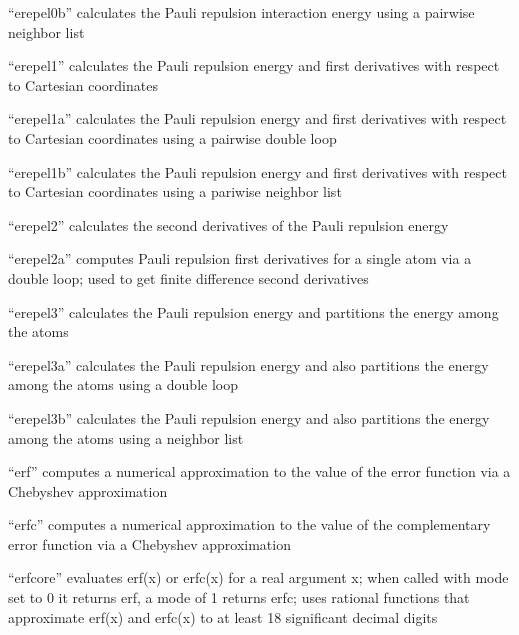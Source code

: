 \documentclass[letterpaper,11pt,english]{sphinxmanual}
\begin{document}
“erepel0b” calculates the Pauli repulsion interaction energy
using a pairwise neighbor list


“erepel1” calculates the Pauli repulsion energy and first
derivatives with respect to Cartesian coordinates


“erepel1a” calculates the Pauli repulsion energy and first
derivatives with respect to Cartesian coordinates using a
pairwise double loop


“erepel1b” calculates the Pauli repulsion energy and first
derivatives with respect to Cartesian coordinates using a
pariwise neighbor list


“erepel2” calculates the second derivatives of the Pauli
repulsion energy


“erepel2a” computes Pauli repulsion first derivatives for a
single atom via a double loop; used to get finite difference
second derivatives


“erepel3” calculates the Pauli repulsion energy and partitions
the energy among the atoms


“erepel3a” calculates the Pauli repulsion energy and also
partitions the energy among the atoms using a double loop


“erepel3b” calculates the Pauli repulsion energy and also
partitions the energy among the atoms using a neighbor list


“erf” computes a numerical approximation to the value of
the error function via a Chebyshev approximation


“erfc” computes a numerical approximation to the value of the
complementary error function via a Chebyshev approximation


“erfcore” evaluates erf(x) or erfc(x) for a real argument x;
when called with mode set to 0 it returns erf, a mode of 1
returns erfc; uses rational functions that approximate erf(x)
and erfc(x) to at least 18 significant decimal digits
\end{document}
